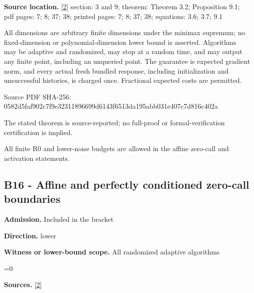 \documentclass[10pt,a4paper]{article}
\newcommand{\AtlasMath}[1]{\par\begingroup\centering\setbox0=\hbox{$\displaystyle #1$}\ifdim\wd0>1.4\linewidth\typeout{ATLAS WIDE FORMULA: \the\wd0}\fi\ifdim\wd0>\linewidth\resizebox{\linewidth}{!}{\box0}\else\box0\fi\par\endgroup}
\begin{document}
\textbf{Source location.} \href{https://github.com/WU-Wendao/Colombo/blob/main/colombo_sensorium/Complexity_altas/data/sources/colombo/SFO_JOINT_20261126/manuscript.pdf}{[2]} section: 3 and 9; theorem: Theorem 3.2; Proposition 9.1; pdf pages: 7; 8; 37; 38; printed pages: 7; 8; 37; 38; equations: 3.6; 3.7; 9.1



All dimensions are arbitrary finite dimensions under the minimax supremum; no fixed-dimension or polynomial-dimension lower bound is asserted. Algorithms may be adaptive and randomized, may stop at a random time, and may output any finite point, including an unqueried point. The guarantee is expected gradient norm, and every actual fresh bundled response, including initialization and unsuccessful histories, is charged once. Fractional expected costs are permitted.



Source PDF SHA-256: 0582d5faf902c7f9e3231189\allowbreak{}6699d6143f6513da195abb03\allowbreak{}1e407c7d816c402a



The stated theorem is source-reported; no full-proof or formal-verification certification is implied.



All finite R0 and lower-noise budgets are allowed in the affine zero-call and activation statements.



\subsection{B16 - Affine and perfectly conditioned zero-call boundaries}


\textbf{Admission.} Included in the bracket



\textbf{Direction.} lower



\textbf{Witness or lower-bound scope.} All randomized adaptive algorithms



\AtlasMath{0}


\textbf{Sources.} \href{https://github.com/WU-Wendao/Colombo/blob/main/colombo_sensorium/Complexity_altas/data/sources/colombo/SFO_JOINT_20261126/manuscript.pdf}{[2]}
\end{document}
